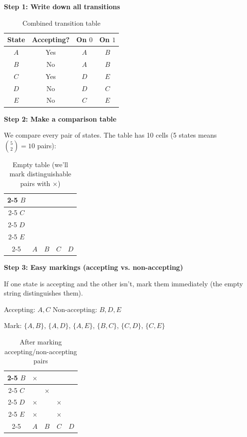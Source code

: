 \documentclass{article}
\theoremstyle{theorem}
\theoremstyle{definition}
\theoremstyle{remark}
\begin{document}
\textbf{Step 1: Write down all transitions}

\begin{table}[H]
  \centering
  \renewcommand{\arraystretch}{1.2}
  \begin{tabular}{|c|c|c|c|}
    \hline
    State & Accepting? & On $0$ & On $1$ \\ \hline
    $A$ & Yes & $A$ & $B$ \\ \hline
    $B$ & No & $A$ & $B$ \\ \hline
    $C$ & Yes & $D$ & $E$ \\ \hline
    $D$ & No & $D$ & $C$ \\ \hline
    $E$ & No & $C$ & $E$ \\ \hline
  \end{tabular}
  \caption{Combined transition table}
\end{table}

\textbf{Step 2: Make a comparison table}

We compare every pair of states. The table has 10 cells (5 states means $\binom{5}{2} = 10$ pairs):

\begin{table}[H]
  \centering
  \begin{tabular}{c|c|c|c|c|}
    \cline{2-5}
    $B$ & \phantom{x} & & & \\ \cline{2-5}
    $C$ & \phantom{x} & \phantom{x} & & \\ \cline{2-5}
    $D$ & \phantom{x} & \phantom{x} & \phantom{x} & \\ \cline{2-5}
    $E$ & \phantom{x} & \phantom{x} & \phantom{x} & \phantom{x} \\ \cline{2-5}
      & $A$ & $B$ & $C$ & $D$ \\
  \end{tabular}
  \caption{Empty table (we'll mark distinguishable pairs with $\times$)}
\end{table}

\textbf{Step 3: Easy markings (accepting vs. non-accepting)}

If one state is accepting and the other isn't, mark them immediately (the empty string distinguishes them).

Accepting: $A, C$ \quad Non-accepting: $B, D, E$

Mark: $\{A,B\}$, $\{A,D\}$, $\{A,E\}$, $\{B,C\}$, $\{C,D\}$, $\{C,E\}$

\begin{table}[H]
  \centering
  \begin{tabular}{c|c|c|c|c|}
    \cline{2-5}
    $B$ & $\times$ & & & \\ \cline{2-5}
    $C$ & \phantom{x} & $\times$ & & \\ \cline{2-5}
    $D$ & $\times$ & \phantom{x} & $\times$ & \\ \cline{2-5}
    $E$ & $\times$ & \phantom{x} & $\times$ & \phantom{x} \\ \cline{2-5}
      & $A$ & $B$ & $C$ & $D$ \\
  \end{tabular}
  \caption{After marking accepting/non-accepting pairs}
\end{table}
\end{document}
